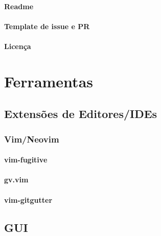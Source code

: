 \documentclass{apostila}
\begin{document}
\subsubsection{Readme}
\subsubsection{Template de issue e PR}
\subsubsection{Licença}

\chapter{Ferramentas}
\section{Extensões de Editores/IDEs}
\subsection{Vim/Neovim}
\subsubsection{vim-fugitive}
\subsubsection{gv.vim}
\subsubsection{vim-gitgutter}

\section{GUI}
\end{document}
